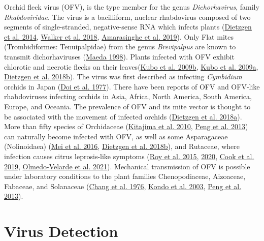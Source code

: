 \documentclass[12pt,final,CPage]{ufthesis}
\begin{document}
{  Orchid fleck virus (OFV), is the type member for the genus \emph{Dichorhavirus}, family \emph{Rhabdoviridae}. The virus is a bacilliform, nuclear rhabdovirus composed of two segments of single-stranded, negative-sense RNA which infects plants (\protect\hyperlink{ref-Dietzgen2014}{Dietzgen et al. 2014}, \protect\hyperlink{ref-Walker2018}{Walker et al. 2018}, \protect\hyperlink{ref-Amarasinghe2019}{Amarasinghe et al. 2019}). Only Flat mites (Trombidiformes: Tenuipalpidae) from the genus \emph{Brevipalpus} are known to transmit dichorhaviruses (\protect\hyperlink{ref-Maeda1998}{Maeda 1998}). Plants infected with OFV exhibit chlorotic and necrotic flecks on their leaves(\protect\hyperlink{ref-Kubo2009}{Kubo et al. 2009b}, \protect\hyperlink{ref-Kubo2009a}{Kubo et al. 2009a}, \protect\hyperlink{ref-Dietzgen2018a}{Dietzgen et al. 2018b}). The virus was first described as infecting \emph{Cymbidium} orchids in Japan (\protect\hyperlink{ref-Doi1977}{Doi et al. 1977}). There have been reports of OFV and OFV-like rhabdoviruses infecting orchids in Asia, Africa, North America, South America, Europe, and Oceania. The prevalence of OFV and its mite vector is thought to be associated with the movement of infected orchids (\protect\hyperlink{ref-Dietzgen2018}{Dietzgen et al. 2018a}). More than fifty species of Orchidaceae (\protect\hyperlink{ref-Kitajima2010}{Kitajima et al. 2010}, \protect\hyperlink{ref-Peng2013}{Peng et al. 2013}) can naturally become infected with OFV, as well as some Asparagaceae (Nolinoidaea) (\protect\hyperlink{ref-Mei2016}{Mei et al. 2016}, \protect\hyperlink{ref-Dietzgen2018a}{Dietzgen et al. 2018b}), and Rutaceae, where infection causes citrus leprosis-like symptoms (\protect\hyperlink{ref-Roy2015}{Roy et al. 2015}, \protect\hyperlink{ref-Roy2020}{2020}, \protect\hyperlink{ref-Cook2019}{Cook et al. 2019}, \protect\hyperlink{ref-Velarde2021}{Olmedo-Velarde et al. 2021}). Mechanical transmission of OFV is possible under laboratory conditions to the plant families Chenopodiaceae, Aizoaceae, Fabaceae, and Solanaceae (\protect\hyperlink{ref-Chang1976}{Chang et al. 1976}, \protect\hyperlink{ref-Kondo2003}{Kondo et al. 2003}, \protect\hyperlink{ref-Peng2013}{Peng et al. 2013}).

  \hypertarget{virus-detection}{%
  \section{Virus Detection}\label{virus-detection}}

}
\end{document}
